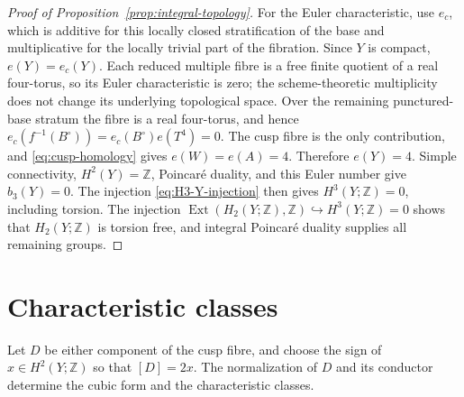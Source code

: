 \begin{proof}[Proof of Proposition~\ref{prop:integral-topology}]
For the Euler characteristic, use $e_c$, which is
additive for this locally closed stratification of the base and
multiplicative for the locally trivial part of the fibration.  Since $Y$
is compact, $e(Y)=e_c(Y)$.  Each reduced multiple fibre is a free finite
quotient of a real four-torus, so its Euler characteristic is zero; the
scheme-theoretic multiplicity does not change its underlying topological
space.  Over the remaining punctured-base stratum the fibre is a real
four-torus, and hence
$e_c(f^{-1}(B^\circ))=e_c(B^\circ)e(T^4)=0$.
The cusp fibre is the only contribution, and
\eqref{eq:cusp-homology} gives $e(W)=e(A)=4$.  Therefore $e(Y)=4$.
Simple connectivity, $H^2(Y)=\mathbb Z$, Poincar\'e duality, and this
Euler number give $b_3(Y)=0$.  The injection
\eqref{eq:H3-Y-injection} then gives $H^3(Y;\mathbb Z)=0$, including
torsion.  The injection
$\operatorname{Ext}(H_2(Y;\mathbb Z),\mathbb Z)\hookrightarrow
H^3(Y;\mathbb Z)=0$ shows that $H_2(Y;\mathbb Z)$ is torsion free,
and integral Poincar\'e duality supplies all remaining groups.
\end{proof}


\section{Characteristic classes}
\label{sec:characteristic-classes}

Let $D$ be either component of the cusp fibre, and choose the sign of
$x\in H^2(Y;\mathbb Z)$ so that $[D]=2x$.  The normalization of $D$
and its conductor determine the cubic form and the characteristic classes.

